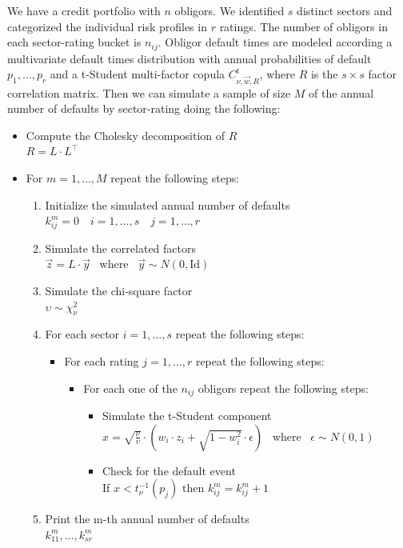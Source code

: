 \documentclass[11pt,fleqn]{book} %
\begin{document}
\begin{algorithm}
	\label{alg:snod}
	We have a credit portfolio with $n$ obligors. We identified $s$ distinct 
	sectors and categorized the individual risk profiles in $r$ ratings. The 
	number of obligors in each sector-rating bucket is $n_{ij}$. 
	Obligor default times are modeled according a multivariate default times 
	distribution with annual probabilities of default $p_1,\dots,p_r$ and a 
	t-Student multi-factor copula $C_{\nu,\vec{w},R}^{\text{t}}$, where $R$ 
	is the $s\times s$ factor correlation matrix. Then we can simulate a sample 
	of size $M$ of the annual number of defaults by sector-rating doing the 
	following:
	\begin{itemize}
		\item Compute the Cholesky decomposition of $R$ \\
		$R = L \cdot L^\intercal$
		\item For $m=1,\dots,M$ repeat the following steps:
		\begin{enumerate}
			\item Initialize the simulated annual number of defaults \\ 
			$k_{ij}^m=0 \quad i=1,\dots,s \quad j=1,\dots,r$
			\item Simulate the correlated factors \\
			$\vec{z} = L \cdot \vec{y}$ ~where~ $\vec{y} \sim N(0,\text{Id})$
			\item Simulate the chi-square factor \\
			$\upsilon \sim \chi_{\nu}^2$
			\item For each sector $i=1,\dots,s$ repeat the following steps:
			\begin{itemize}
				\item For each rating $j=1,\dots,r$ repeat the following steps:
				\begin{itemize}
					\item For each one of the $n_{ij}$ obligors repeat the following steps:
					\begin{itemize}
						\item Simulate the t-Student component \\
						$x = \sqrt{\frac{\nu}{\upsilon}} \cdot \left( w_i \cdot z_i + \sqrt{1-w_i^2} \cdot \epsilon \right)$
						~where~ $\epsilon \sim N(0,1)$
						\item Check for the default event \\
						If $x < t_{\nu}^{-1}(p_j)$ then $k_{ij}^m = k_{ij}^m + 1$
					\end{itemize}
				\end{itemize}
			\end{itemize}
			\item Print the m-th annual number of defaults \\
			$k_{11}^m,\dots,k_{sr}^m$
		\end{enumerate}
	\end{itemize}
\end{algorithm}
\end{document}
